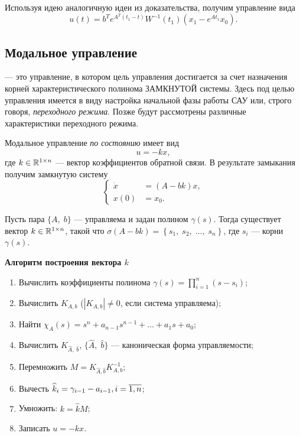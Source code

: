\documentclass[../../TAU.tex]{subfiles}
\begin{document}
    Используя идею аналогичную идеи из доказательства, получим управление вида
    $$
        u(t) = b^Te^{A^T(t_1-t)}W^{-1}(t_1)(x_1 - e^{At_1}x_0).
    $$

\subsection{Модальное управление}

     --- это управление, в котором цель управления достигается за счет назначения корней характеристического полинома ЗАМКНУТОЙ системы. Здесь под целью управления имеется в виду настройка начальной фазы работы САУ или, строго говоря, {\it переходного режима}. Позже будут рассмотрены различные характеристики переходного режима.

    Модальное управление {\it по состоянию} имеет вид
    $$
        u = -kx,
    $$
    где $k\in\mathbb{R}^{1\times n}$ --- вектор коэффициентов обратной связи. В результате замыкания получим замкнутую систему
    $$
        \left\{
        \begin{aligned}
            \dot x &= (A - bk)x,\\
            x(0) &= x_0.
        \end{aligned}
        \right.
    $$

    \begin{theor} 
        Пусть пара $\{A,\; b\}$ --- управляема и задан полином $\gamma(s)$. Тогда существует вектор 
        $k\in\mathbb{R}^{1\times n}$, 
        такой что 
        $\sigma(A-bk) = \left\{s_1,\; s_2,\;\ldots,\; s_n\right\}$, где $s_i$ --- корни $\gamma(s)$.
    \end{theor}

    \textbf{Алгоритм построения вектора $k$}

    \begin{enumerate}
    \item 
        Вычислить коэффициенты полинома $\gamma(s) = \prod_{i=1}^{n}(s-s_i)$;
    \item 
        Вычислить $K_{A,b}$ ($|K_{A,b}|\neq0$, если система управляема);
    \item 
        Найти $\chi_A(s) = s^n + a_{n-1}s^{n-1} + \ldots + a_1 s + a_0$;
    \item 
        Вычислить $K_{\widehat A,\; \widehat b}$, $\{\widehat A,\; \widehat b\}$ --- каноническая форма управляемости;
    \item 
        Перемножить $M = K_{\widehat A, \widehat b} K^{-1}_{A,b}$;
    \item 
        Вычесть $\widehat k_i = \gamma_{i-1} - a_{i-1}, i=\overline{1,n}$;
    \item 
        Умножить: $k = \widehat k M$;
    \item 
        Записать $u = -k x$.
    \end{enumerate}
\end{document}
